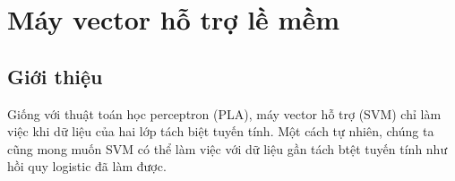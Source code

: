 \chapter{Máy vector hỗ trợ lề mềm}
 
 
\section{Giới thiệu}
Giống với thuật toán học perceptron (PLA), máy vector hỗ trợ (SVM) chỉ làm việc khi dữ liệu của hai lớp tách biệt tuyến tính. Một cách tự nhiên, chúng ta cũng mong muốn SVM có thể làm việc với dữ liệu gần tách btệt tuyến tính như hồi quy logistic đã làm được.  
 
 

 
 
 
 
 

